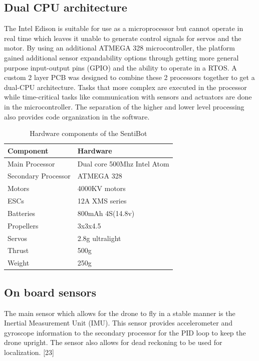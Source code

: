 \documentclass[12pt]{article}
\begin{document}
\subsection{Dual CPU architecture}

The Intel Edison is suitable for use as a microprocessor but cannot operate in real time which leaves it unable to generate control signals for servos and the motor. By using an additional ATMEGA 328 microcontroller, the platform gained additional sensor expandability options through getting more general purpose input-output pins (GPIO) and the ability to operate in a RTOS. A custom 2 layer PCB was designed to combine these 2 processors together to get a dual-CPU architecture. Tasks that more complex are executed in the processor while time-critical tasks like communication with sensors and actuators are done in the microcontroller. The separation of the higher and lower level processing also provides code organization in the software.

\begin{table}
	\begin{tabular}{ | l | l | }
		Component & Hardware \\
		\hline
		Main Processor & Dual core 500Mhz Intel Atom \\
		Secondary Processor & ATMEGA 328 \\
		Motors & 4000KV motors \\
		ESCs & 12A XMS series \\
		Batteries & 800mAh 4S(14.8v) \\
		Propellers & 3x3x4.5 \\
		Servos & 2.8g ultralight \\
		Thrust & 500g \\
		Weight & 250g \\
	\end{tabular}
	\caption{Hardware components of the SentiBot}
	\label{fig:sb-components}
\end{table}

\subsection{On board sensors}

The main sensor which allows for the drone to fly in a stable manner is the Inertial Measurement Unit (IMU). This sensor provides accelerometer and gyroscope information to the secondary processor for the PID loop to keep the drone upright. The sensor also allows for dead reckoning to be used for localization. [23]
\end{document}
